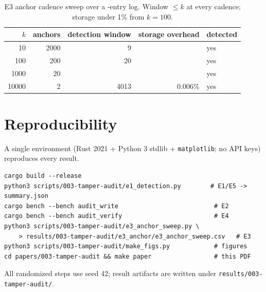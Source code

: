 \documentclass[11pt]{article}
\begin{document}
\begin{table}[htb]\centering\small
\begin{tabular}{rrrrl}
\toprule
$k$ & anchors & detection window & storage overhead & detected \\
\midrule
10 & 2000 & 9 & \OverheadKten{} & yes \\
100 & 200 & 20 & \OverheadKhund{} & yes \\
1000 & 20 & \WindowKthou{} & \OverheadKthou{} & yes \\
10000 & 2 & 4013 & 0.006\% & yes \\
\bottomrule
\end{tabular}
\caption{E3 anchor cadence sweep over a \AnchorN{}-entry log. Window $\le k$ at every
cadence; storage under 1\% from $k{=}100$.}
\label{tab:anchor}
\end{table}

\section{Reproducibility}\label{app:reproduce}
A single environment (Rust 2021 + Python 3 stdlib + \texttt{matplotlib}; no API
keys) reproduces every result.
\begin{lstlisting}[style=housespecyamlbare]
cargo build --release
python3 scripts/003-tamper-audit/e1_detection.py        # E1/E5 -> summary.json
cargo bench --bench audit_write                          # E2
cargo bench --bench audit_verify                         # E4
python3 scripts/003-tamper-audit/e3_anchor_sweep.py \
    > results/003-tamper-audit/e3_anchor/e3_anchor_sweep.csv   # E3
python3 scripts/003-tamper-audit/make_figs.py            # figures
cd papers/003-tamper-audit && make paper                 # this PDF
\end{lstlisting}
All randomized steps use seed 42; result artifacts are written under
\texttt{results/003-tamper-audit/}.

\clearpage


\end{document}

